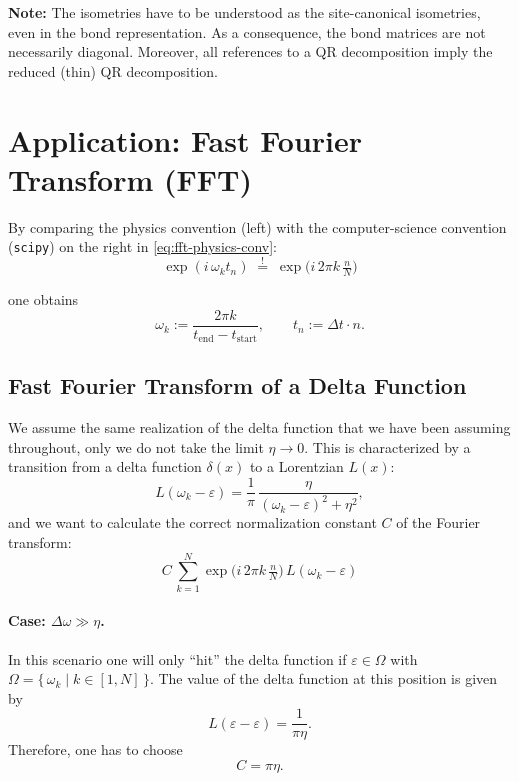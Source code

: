 \textbf{Note:} The isometries have to be understood as the site-canonical isometries,
even in the bond representation. As a consequence,
the bond matrices are not necessarily diagonal. Moreover, all references to a QR decomposition imply the reduced (thin) QR decomposition.

\section{Application: Fast Fourier Transform (FFT)}

By comparing the physics convention (left) with the computer-science
convention (\texttt{scipy}) on the right in \eqref{eq:fft-physics-conv}:
\begin{equation}\label{eq:fft-physics-conv}
  \exp(i\,\omega_k t_n) \;\overset{!}{=}\; \exp\!\Big(i\,2\pi k\,\tfrac{n}{N}\Big)
\end{equation}

one obtains
\begin{equation*}\label{eq:fft-omega-t}
  \omega_k := \frac{2\pi k}{t_{\text{end}} - t_{\text{start}}},
  \qquad
  t_n := \Delta t \cdot n .
\end{equation*}

\subsection{Fast Fourier Transform of a Delta Function}

We assume the same realization of the delta function that we have been
assuming throughout, only we do not take the limit $\eta \to 0$.
This is characterized by a transition from a delta function $\delta(x)$ to a Lorentzian $L(x)$:
\begin{equation*}\label{eq:delta-lorentzian}
  L(\omega_k - \varepsilon)
  = \frac{1}{\pi}\,\frac{\eta}{(\omega_k - \varepsilon)^2 + \eta^2},
\end{equation*}
and we want to calculate the correct normalization constant $C$ of the
Fourier transform:
\begin{equation*}\label{eq:fft-delta-sum}
  C\, \sum_{k=1}^{N}
     \exp\!\Big(i\,2\pi k\,\tfrac{n}{N}\Big)\,
     L(\omega_k - \varepsilon)
\end{equation*}

\paragraph{Case: $\Delta\omega \gg \eta$.}
In this scenario one will only ``hit'' the delta function if
$\varepsilon \in \Omega$ with $\Omega = \{\,\omega_k \mid k \in [1, N]\,\}$.
The value of the delta function at this position is given by
\begin{equation*}\label{eq:delta-peak}
  L(\varepsilon - \varepsilon) = \frac{1}{\pi\eta}.
\end{equation*}
Therefore, one has to choose
\begin{equation*}\label{eq:fft-C}
  C = \pi\eta .
\end{equation*}

